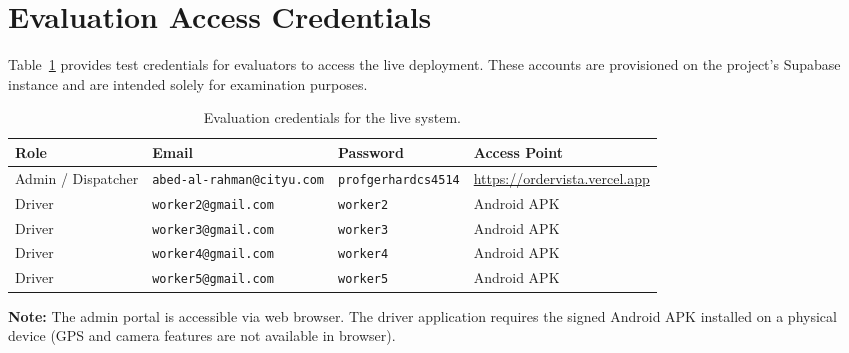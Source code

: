\section{Evaluation Access Credentials}
\label{sec:eval-creds}

Table~\ref{tab:eval-creds} provides test credentials for evaluators to
access the live deployment.  These accounts are provisioned on the project's
Supabase instance and are intended solely for examination purposes.

\begin{table}[H]
\centering
\caption{Evaluation credentials for the live system.}
\label{tab:eval-creds}
\begin{tabular}{@{}llll@{}}
\toprule
\textbf{Role} & \textbf{Email} & \textbf{Password} & \textbf{Access Point}\\
\midrule
Admin / Dispatcher & \texttt{abed-al-rahman@cityu.com} & \texttt{profgerhardcs4514} & \url{https://ordervista.vercel.app} \\
Driver             & \texttt{worker2@gmail.com}          & \texttt{worker2}          & Android APK \\
Driver             & \texttt{worker3@gmail.com}          & \texttt{worker3}          & Android APK \\
Driver             & \texttt{worker4@gmail.com}          & \texttt{worker4}          & Android APK \\
Driver             & \texttt{worker5@gmail.com}          & \texttt{worker5}          & Android APK \\
\bottomrule
\end{tabular}
\end{table}

\noindent\textbf{Note:} The admin portal is accessible via web browser.  The
driver application requires the signed Android APK installed on a physical
device (GPS and camera features are not available in browser).
